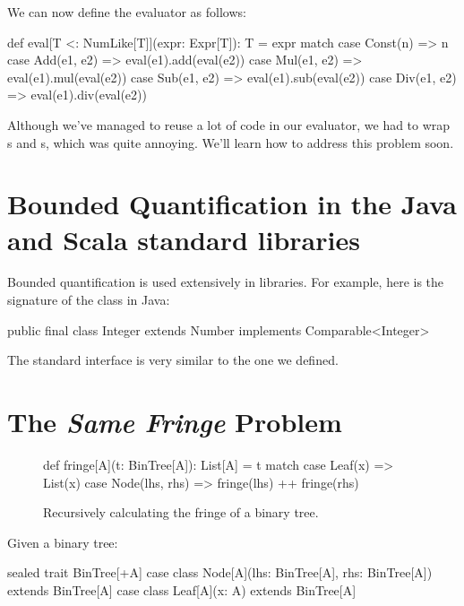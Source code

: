 \documentclass{book}
\begin{document}
We can now define the evaluator as follows:

\begin{scalacode}
def eval[T <: NumLike[T]](expr: Expr[T]): T = expr match {
  case Const(n) => n
  case Add(e1, e2) => eval(e1).add(eval(e2))
  case Mul(e1, e2) => eval(e1).mul(eval(e2))
  case Sub(e1, e2) => eval(e1).sub(eval(e2))
  case Div(e1, e2) => eval(e1).div(eval(e2))
}
\end{scalacode}

Although we've managed to reuse a lot of code in our evaluator,
we had to wrap s and s, which was
quite annoying. We'll learn how to address this problem soon.

\section{Bounded Quantification in the Java and Scala standard libraries}

Bounded quantification is used extensively in libraries. For example,
here is the signature of the  class in Java:

\begin{scalacode}
public final class Integer extends Number implements Comparable<Integer>
\end{scalacode}

The standard  interface is very similar to the one we
defined.



\newlecture

\section{The \emph{Same Fringe} Problem}

\begin{figure}
\begin{scalacode}
def fringe[A](t: BinTree[A]): List[A] = t match {
  case Leaf(x) => List(x)
  case Node(lhs, rhs) => fringe(lhs) ++ fringe(rhs)
}
\end{scalacode}
\caption{Recursively calculating the fringe of a binary tree.}
\label{fringeRec}
\end{figure}

Given a binary tree:

\begin{scalacode}
sealed trait BinTree[+A]
case class Node[A](lhs: BinTree[A], rhs: BinTree[A]) extends BinTree[A]
case class Leaf[A](x: A) extends BinTree[A]
\end{scalacode}
\end{document}
